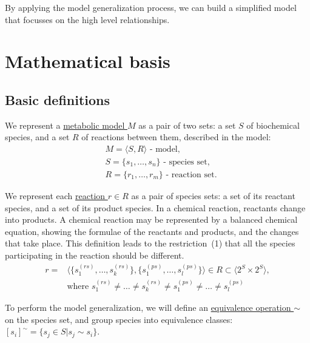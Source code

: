 \documentclass[10pt]{bmc_article}
\newenvironment{bmcformat}{\baselineskip20pt\sloppy\setboolean{publ}{false}}{\baselineskip20pt\sloppy}
\begin{document}
\begin{bmcformat}
By applying the model generalization process, we can build a simplified model that focusses on the high level relationships. 


\section*{Mathematical basis}

\subsection*{Basic definitions}

We represent a \underline{metabolic model $M$} as a pair of two sets: a set $S$ of biochemical species, and a set $R$ of reactions between them, described in the model: 
\begin{align*} 
& M = \langle S, R \rangle\text{ - model},\\
& S = \{s_1, \ldots, s_n\}\text{ - species set},\\
& R = \{r_1, \ldots, r_m\}\text{ - reaction set}.
\end{align*}

We represent each \underline{reaction $r \in R$} as a pair of species sets: a set of its reactant species, and a set of its product species. In a chemical reaction, reactants change into products. A chemical reaction may be represented by a balanced chemical equation, showing the formulae of the reactants and products, and the changes that take place\cite{Clugston2000}. This definition leads to the restriction~(1) that all the species participating in the reaction should be different.
\begin{align} 
\nonumber r = &\langle\{s^{(rs)}_1, \ldots, s^{(rs)}_k\},\{s^{(ps)}_1, \ldots, s^{(ps)}_l\}\rangle
\in R \subset \langle 2^S \times 2^S \rangle, \\
&\text{where }s^{(rs)}_1 \neq \ldots \neq s^{(rs)}_k \neq s^{(ps)}_1 \neq \ldots \neq s^{(ps)}_l
\end{align}

To perform the model generalization, we will define an \underline{equivalence operation $\sim$} on the species set, and group species into equivalence classes: $[s_i]^{\sim} = \{s_j \in S | s_j \sim s_i\}$.


\end{bmcformat}
\end{document}
